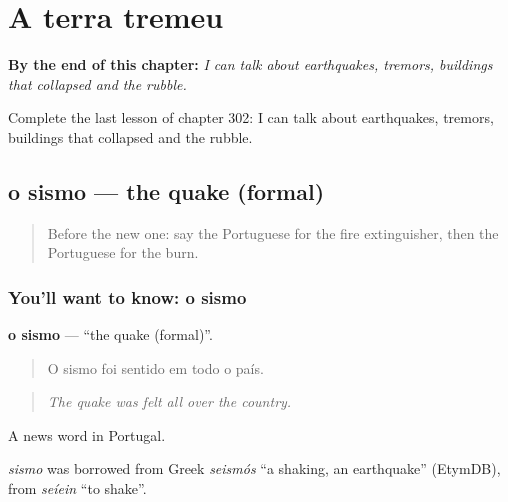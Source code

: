 
\chapter{A terra tremeu}
\label{ch:pt-a-terra-tremeu}

\begin{chapteropening}
\textbf{By the end of this chapter:} \emph{I can talk about earthquakes, tremors, buildings that collapsed and the rubble.}

Complete the last lesson of chapter 302: I can talk about earthquakes, tremors, buildings that collapsed and the rubble.
\end{chapteropening}

\section[o sismo]{o sismo — the quake (formal)}

\label{lesson:PT-C302-sismo}



\begin{quote}
Before the new one: say the Portuguese for the fire extinguisher, then the Portuguese for the burn.
\end{quote}

\subsection*{You'll want to know: o sismo}
\textbf{o sismo} — \textquotedblleft{}the quake (formal)\textquotedblright{}.

\begin{quote}
O sismo foi sentido em todo o país.
\end{quote}

\begin{quote}
\emph{The quake was felt all over the country.}
\end{quote}

A news word in Portugal.

\begin{cousinweb}
\emph{sismo} was borrowed from Greek \emph{seismós} \textquotedblleft{}a shaking, an earthquake\textquotedblright{} (EtymDB), from \emph{seíein} \textquotedblleft{}to shake\textquotedblright{}.
\end{cousinweb}

